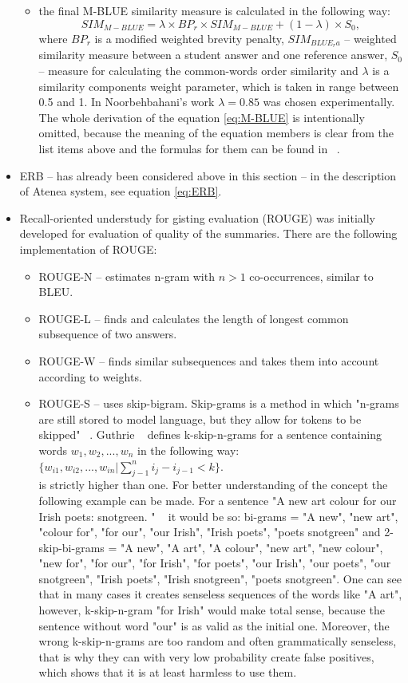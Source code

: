 \documentclass[11pt]{report}
\numberwithin{equation}{section} %
\begin{document}
\begin{itemize}
\begin{itemize}
\item the final M-BLUE similarity measure is calculated in the following way:
\begin{equation} \label{eq:M-BLUE}
SIM_{M-BLUE} = \lambda \times BP_r \times SIM_{M-BLUE} + (1 - \lambda) \times S_0,
\end{equation}
where $BP_r$ is a modified weighted brevity penalty, $SIM_{BLUE_ra}$ -- weighted similarity measure between a student answer and one reference answer, $S_0$ --  measure for calculating the common-words order similarity and $\lambda$ is a similarity components weight parameter, which is taken in range between 0.5 and 1. In Noorbehbahani's work $\lambda = 0.85$ was chosen experimentally. The whole derivation of the equation \ref{eq:M-BLUE} is intentionally omitted, because the meaning of the equation members is clear from the list items above and the formulas for them can be found in ~\cite{Noorbehbahani}.
\end{itemize}
\item ERB -- has already been considered above in this section -- in the description of Atenea system, see equation \ref{eq:ERB}.
\item Recall-oriented understudy for gisting evaluation (ROUGE) was initially developed for evaluation of quality of the summaries. There are the following implementation of ROUGE:
\begin{itemize}
\item ROUGE-N -- estimates n-gram with $n>1$ co-occurrences, similar to BLEU.
\item ROUGE-L -- finds and calculates the length of longest common subsequence of two answers.
\item ROUGE-W -- finds similar subsequences and takes them into account according to weights.
\item ROUGE-S -- uses skip-bigram. Skip-grams is a method in which "n-grams are still stored to model language, but they allow for tokens to be skipped" ~\cite{Skip-gram}. Guthrie  ~\cite{Skip-gram} defines k-skip-n-grams for a sentence containing words $w_1,w_2,...,w_n$ in the following way:\\
$\{w_{i1},w_{i2},...,w_{in} | \sum_{j-1}^n i_j - i_{j-1} < k\}$.\\
is strictly higher than one. For better understanding of the concept the following example can be made. For a sentence "A new art colour for our Irish
poets: snotgreen. " ~\cite{Ulysses} it would be so: bi-grams = {"A new", "new art", "colour for", "for our", "our Irish", "Irish
poets", "poets snotgreen"} and 2-skip-bi-grams = {"A new", "A art", "A colour", "new art", "new colour", "new for", "for our", "for Irish", "for poets", "our Irish", "our poets", "our snotgreen", "Irish poets", "Irish snotgreen",  "poets snotgreen"}. One can see that in many cases it creates senseless sequences of the words like "A art", however, k-skip-n-gram "for Irish" would make total sense, because the sentence without word "our" is as valid as the initial one. Moreover, the wrong k-skip-n-grams are too random and often grammatically senseless, that is why they can with very low probability create false positives, which shows that it is at least harmless to use them.

\end{itemize}
\end{itemize}
\end{document}
